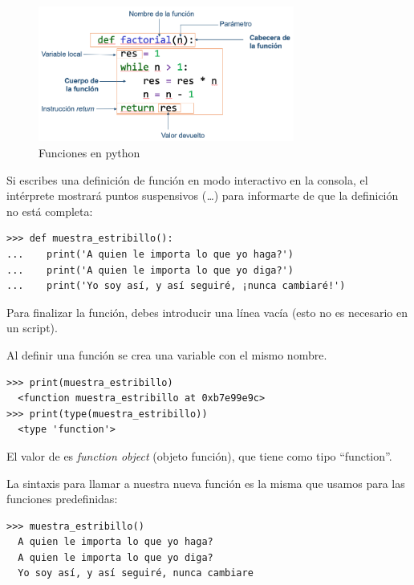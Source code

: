 \begin{figure}
    \centering
    \includegraphics[width=0.75\textwidth]{images/funciones_partes.png}
    \caption{Funciones en python}
    \label{fig:partes_funciones}
\end{figure}


Si escribes una definición de función en modo interactivo en la consola, el intérprete
mostrará puntos suspensivos (\emph{\ldots{}}) para informarte de que la
definición no está completa:

\begin{Verbatim}[frame=single]
>>> def muestra_estribillo():
...    print('A quien le importa lo que yo haga?')
...    print('A quien le importa lo que yo diga?')
...    print('Yo soy así, y así seguiré, ¡nunca cambiaré!')
\end{Verbatim}

Para finalizar la función, debes introducir una línea vacía (esto no es
necesario en un script).

Al definir una función se crea una variable con el mismo nombre.

\begin{Verbatim}[frame=single]
>>> print(muestra_estribillo)
  <function muestra_estribillo at 0xb7e99e9c>
>>> print(type(muestra_estribillo))
  <type 'function'>
\end{Verbatim}

El valor de  es \emph{function object}
(objeto función), que tiene como tipo ``function''.

 

La sintaxis para llamar a nuestra nueva función es la misma que usamos
para las funciones predefinidas:

\begin{Verbatim}[frame=single]
>>> muestra_estribillo()
  A quien le importa lo que yo haga?
  A quien le importa lo que yo diga?
  Yo soy así, y así seguiré, nunca cambiare
\end{Verbatim}

